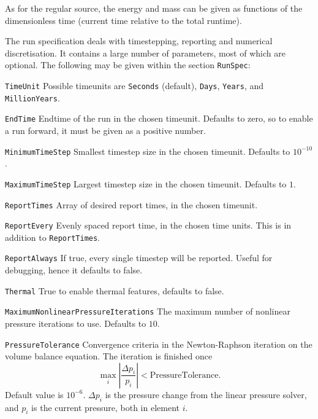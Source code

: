 As for the regular source, the energy and mass can be given as
functions of the dimensionless time (current time relative to the
total runtime).



The run specification deals with timestepping, reporting and numerical
discretisation. It contains a large number of parameters, most of
which are optional. The following may be given within the section
\texttt{RunSpec}:

\begin{list}{}{}
\item[\texttt{TimeUnit}] Possible timeunits are \texttt{Seconds}
  (default), \texttt{Days}, \texttt{Years}, and \texttt{MillionYears}.
\item[\texttt{EndTime}] Endtime of the run in the chosen timeunit.
  Defaults to zero, so to enable a run forward, it must be given as a
  positive number.
\item[\texttt{MinimumTimeStep}] Smallest timestep size in the chosen
  timeunit. Defaults to $10^{-10}$.
\item[\texttt{MaximumTimeStep}] Largest timestep size in the chosen
  timeunit. Defaults to $1$.
\item[\texttt{ReportTimes}] Array of desired report times, in the
  chosen timeunit.
\item[\texttt{ReportEvery}] Evenly spaced report time, in the chosen
  time units. This is in addition to \texttt{ReportTimes}.
\item[\texttt{ReportAlways}] If true, every single timestep will be
  reported. Useful for debugging, hence it defaults to false.
\item[\texttt{Thermal}] True to enable thermal features, defaults to
  false.
\item[\texttt{MaximumNonlinearPressureIterations}] The maximum number
  of nonlinear pressure iterations to use. Defaults to $10$.
\item[\texttt{PressureTolerance}] Convergence criteria in the
  Newton-Raphson iteration on the volume balance equation. The
  iteration is finished once
  \begin{equation}
    \max_i \left|\frac{\Delta p_i}{p_i}\right| < \text{PressureTolerance}.
  \end{equation}
  Default value is $10^{-6}$. $\Delta p_i$ is the pressure change from
  the linear pressure solver, and $p_i$ is the current pressure, both
  in element $i$.
\end{list}


